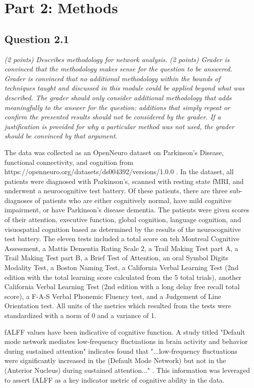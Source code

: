 \documentclass[12pt]{article}
\begin{document}
\section{Part 2: Methods}

\subsection{Question 2.1}
\textit{ (2 points) Describes methodology for network analysis.}
\textit{(2 points) Grader is convinced that the methodology makes sense for the question to be answered. Grader is convinced that no additional methodology within the bounds of techniques taught and discussed in this module could be applied beyond what was described. The grader should only consider additional methodology that adds meaningfully to the answer for the question: additions that simply repeat or confirm the presented results should not be considered by the grader. If a justification is provided for why a particular method was not used, the grader should be convinced by that argument. }

The data was collected as an OpenNeuro dataset on Parkinson's Disease, functional connectivity, and cognition from https://openneuro.org/datasets/ds004392/versions/1.0.0 \cite{ds004392:1.0.0}. In the dataset, all patients were diagnosed with Parkinson's, scanned with resting state fMRI, and underwent a neurocognitive test battery. Of these patients, there are three sub-diagnoses of patients who are either cognitively normal, have mild cognitive impairment, or have Parkinson's disease dementia. The patients were given scores of their attention, executive function, global cognition, language cognition, and visuospatial cognition based as determined by the results of the neurocognitive test battery. The eleven tests included a total score on teh Montreal Cognitive Assessment, a Mattis Dementia Rating Scale 2, a Trail Making Test part A, a Trail Making Test part B, a Brief Test of Attention, an oral Symbol Digits Modality Test, a Boston Naming Test, a California Verbal Learning Test (2nd edition with the total learning score calculated from the 5 total trials), another California Verbal Learning Test (2nd edition with a long delay free recall total score), a F-A-S Verbal Phonemic Fluency test, and a Judgement of Line Orientation test. All units of the metrics which resulted from the tests were standardized with a norm of 0 and a variance of 1.

fALFF values have been indicative of cognitive function. A study titled "Default mode network mediates low‐frequency fluctuations in brain activity and behavior during sustained attention" indicates found that "...low‐frequency fluctuations were significantly increased in the (Default Mode Network) but not in the (Anterior Nucleus) during sustained attention..." \cite{35903957}. This information was leveraged to assert fALFF as a key indicator metric of cognitive ability in the data.
\end{document}
